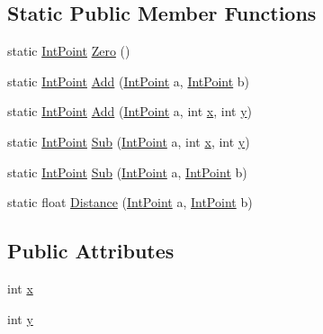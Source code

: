 \subsection*{Static Public Member Functions}
\begin{DoxyCompactItemize}
\item 
static \mbox{\hyperlink{struct_int_point}{Int\+Point}} \mbox{\hyperlink{struct_int_point_ad3c6094ef41ce5eb1717aba101160c94}{Zero}} ()
\item 
static \mbox{\hyperlink{struct_int_point}{Int\+Point}} \mbox{\hyperlink{struct_int_point_a241b96189209f3c2036424091a910909}{Add}} (\mbox{\hyperlink{struct_int_point}{Int\+Point}} a, \mbox{\hyperlink{struct_int_point}{Int\+Point}} b)
\item 
static \mbox{\hyperlink{struct_int_point}{Int\+Point}} \mbox{\hyperlink{struct_int_point_a4f467361e4cd5eebddeddcb9f6b8ffa4}{Add}} (\mbox{\hyperlink{struct_int_point}{Int\+Point}} a, int \mbox{\hyperlink{struct_int_point_a939365b5f010e65361371b8ee69c2080}{x}}, int \mbox{\hyperlink{struct_int_point_ac7e0bbc435a90aac2c4136ec83e3f3ef}{y}})
\item 
static \mbox{\hyperlink{struct_int_point}{Int\+Point}} \mbox{\hyperlink{struct_int_point_ab9a48f33c1886477e13049121e16a070}{Sub}} (\mbox{\hyperlink{struct_int_point}{Int\+Point}} a, int \mbox{\hyperlink{struct_int_point_a939365b5f010e65361371b8ee69c2080}{x}}, int \mbox{\hyperlink{struct_int_point_ac7e0bbc435a90aac2c4136ec83e3f3ef}{y}})
\item 
static \mbox{\hyperlink{struct_int_point}{Int\+Point}} \mbox{\hyperlink{struct_int_point_add7064e8013bc061ff7c800362c78634}{Sub}} (\mbox{\hyperlink{struct_int_point}{Int\+Point}} a, \mbox{\hyperlink{struct_int_point}{Int\+Point}} b)
\item 
static float \mbox{\hyperlink{struct_int_point_ad43affc9a7f25aa4bf680b756a3b81da}{Distance}} (\mbox{\hyperlink{struct_int_point}{Int\+Point}} a, \mbox{\hyperlink{struct_int_point}{Int\+Point}} b)
\end{DoxyCompactItemize}
\subsection*{Public Attributes}
\begin{DoxyCompactItemize}
\item 
int \mbox{\hyperlink{struct_int_point_a939365b5f010e65361371b8ee69c2080}{x}}
\item 
int \mbox{\hyperlink{struct_int_point_ac7e0bbc435a90aac2c4136ec83e3f3ef}{y}}
\end{DoxyCompactItemize}


